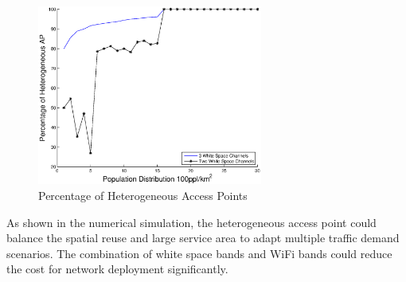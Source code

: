 \begin{figure}
\centering
\includegraphics[width=74mm]{figures/percentage}
\vspace{-0.1in}
\caption{Percentage of Heterogeneous Access Points}                                                                 
\label{fig:heappercentage}
\vspace{-0.1in}
\end{figure}

As shown in the numerical simulation, the heterogeneous access point could balance
the spatial reuse and large service area to adapt multiple traffic demand scenarios.
The combination of white space bands and WiFi bands could reduce the cost for
network deployment significantly.






